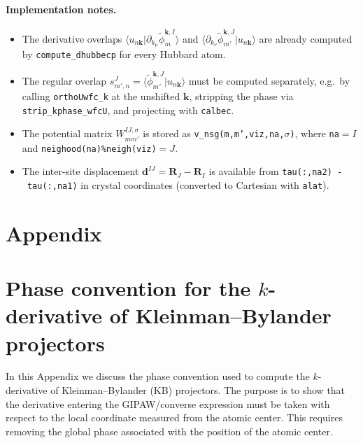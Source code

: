 \documentclass[11pt]{article}
\begin{document}
\paragraph{Implementation notes.}
\begin{itemize}
  \item The derivative overlaps
    $\langle u_{n\mathbf{k}}|\partial_{k_\mu}\widetilde\phi^{\mathbf{k},I}_{m}\rangle$
    and
    $\langle\partial_{k_\nu}\widetilde\phi^{\mathbf{k},J}_{m'}|u_{n\mathbf{k}}\rangle$
    are already computed by \texttt{compute\_dhubbecp} for every Hubbard
    atom.

  \item The regular overlap $s^J_{m',n}=\langle\widetilde\phi^{\mathbf{k},J}_{m'}|u_{n\mathbf{k}}\rangle$
    must be computed separately, e.g.\ by calling \texttt{orthoUwfc\_k}
    at the unshifted $\mathbf{k}$, stripping the phase via
    \texttt{strip\_kphase\_wfcU}, and projecting with \texttt{calbec}.

  \item The potential matrix $W_{mm'}^{IJ,\sigma}$ is stored as
    \texttt{v\_nsg(m,m',viz,na,$\sigma$)}, where \texttt{na}$=I$ and
    \texttt{neighood(na)\%neigh(viz)}$=J$.

  \item The inter-site displacement $\mathbf{d}^{IJ}=\mathbf{R}_J-\mathbf{R}_I$
    is available from \texttt{tau(:,na2)~-~tau(:,na1)} in crystal
    coordinates (converted to Cartesian with \texttt{alat}).
\end{itemize}


\appendix
\section*{Appendix}

\section{Phase convention for the $k$-derivative of Kleinman--Bylander projectors}
\label{app:kb_no_phase}

In this Appendix we discuss the phase convention used to compute the
$k$-derivative of Kleinman--Bylander (KB) projectors. The purpose is to
show that the derivative entering the GIPAW/converse expression must be
taken with respect to the local coordinate measured from the atomic
center. This requires removing the global phase associated with the
position of the atomic center.
\end{document}
